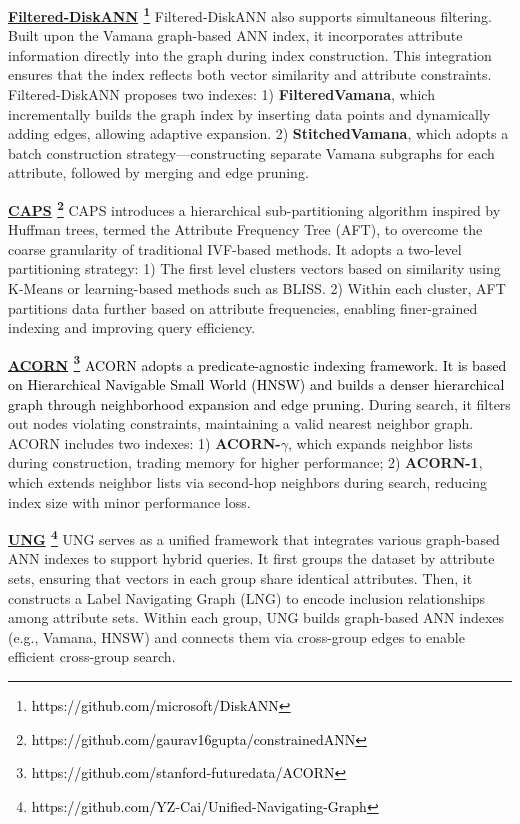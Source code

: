 \documentclass[sigconf, nonacm, pdfa]{acmart}
\begin{document}
{	\noindent\textbf{\underline{Filtered-DiskANN} \footnote{\textcolor{black}{https://github.com/microsoft/DiskANN}}} \cite{Filtered-diskann}
	Filtered-DiskANN also supports simultaneous filtering. Built upon the Vamana \cite{diskann} graph-based ANN index, it incorporates attribute information directly into the graph during index construction. This integration ensures that the index reflects both vector similarity and attribute constraints. 
	Filtered-DiskANN proposes two indexes:  
	1) \textbf{FilteredVamana}, which incrementally builds the graph index by inserting data points and dynamically adding edges, allowing adaptive expansion.  
	2) \textbf{StitchedVamana}, which adopts a batch construction strategy—constructing separate Vamana subgraphs for each attribute, followed by merging and edge pruning.

	
	
	\noindent\textbf{\underline{CAPS} \footnote{\textcolor{black}{https://github.com/gaurav16gupta/constrainedANN}}}\cite{CAPS}
	CAPS introduces a hierarchical sub-partitioning algorithm inspired by Huffman trees, termed the Attribute Frequency Tree (AFT), to overcome the coarse granularity of traditional IVF-based methods. It adopts a two-level partitioning strategy:  
	1) The first level clusters vectors based on similarity using K-Means or learning-based methods such as BLISS. 2) Within each cluster, AFT partitions data further based on attribute frequencies, enabling finer-grained indexing and improving query efficiency.
	
	\noindent\textbf{\underline{ACORN} \footnote{\textcolor{black}{https://github.com/stanford-futuredata/ACORN}}}
	\cite{ACORN}
	\textcolor{black}{ACORN adopts a predicate-agnostic indexing framework. It is based on Hierarchical Navigable Small World (HNSW) \cite{hnsw} and builds a denser hierarchical graph through neighborhood expansion and edge pruning.}
	During search, it filters out nodes violating constraints, maintaining a valid nearest neighbor graph.
	ACORN includes two indexes: 1) \textbf{ACORN-$\gamma$}, which expands neighbor lists during construction, trading memory for higher performance; 
	2) \textbf{ACORN-1}, which extends neighbor lists via second-hop neighbors during search, reducing index size with minor performance loss.
	
	\noindent\textbf{\underline{UNG} \footnote{\textcolor{black}{https://github.com/YZ-Cai/Unified-Navigating-Graph}}} \cite{UNG}
	UNG serves as a unified framework that integrates various graph-based ANN indexes to support hybrid queries. It first groups the dataset by attribute sets, ensuring that vectors in each group share identical attributes. Then, it constructs a Label Navigating Graph (LNG) to encode inclusion relationships among attribute sets. Within each group, UNG builds graph-based ANN indexes (e.g., Vamana, HNSW) and connects them via cross-group edges to enable efficient cross-group search.

}
\end{document}
